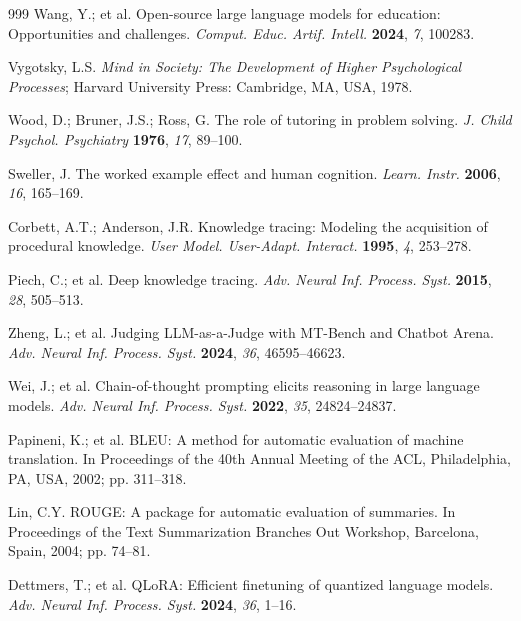 \documentclass[applsci,article,submit,pdftex,moreauthors]{Definitions/mdpi}
\begin{document}
\begin{thebibliography}{999}
Wang, Y.; et al. Open-source large language models for education: Opportunities and challenges. \textit{Comput. Educ. Artif. Intell.} \textbf{2024}, \textit{7}, 100283.

Vygotsky, L.S. \textit{Mind in Society: The Development of Higher Psychological Processes}; Harvard University Press: Cambridge, MA, USA, 1978.

Wood, D.; Bruner, J.S.; Ross, G. The role of tutoring in problem solving. \textit{J. Child Psychol. Psychiatry} \textbf{1976}, \textit{17}, 89--100.

Sweller, J. The worked example effect and human cognition. \textit{Learn. Instr.} \textbf{2006}, \textit{16}, 165--169.

Corbett, A.T.; Anderson, J.R. Knowledge tracing: Modeling the acquisition of procedural knowledge. \textit{User Model. User-Adapt. Interact.} \textbf{1995}, \textit{4}, 253--278.

Piech, C.; et al. Deep knowledge tracing. \textit{Adv. Neural Inf. Process. Syst.} \textbf{2015}, \textit{28}, 505--513.

Zheng, L.; et al. Judging LLM-as-a-Judge with MT-Bench and Chatbot Arena. \textit{Adv. Neural Inf. Process. Syst.} \textbf{2024}, \textit{36}, 46595--46623.

Wei, J.; et al. Chain-of-thought prompting elicits reasoning in large language models. \textit{Adv. Neural Inf. Process. Syst.} \textbf{2022}, \textit{35}, 24824--24837.

Papineni, K.; et al. BLEU: A method for automatic evaluation of machine translation. In Proceedings of the 40th Annual Meeting of the ACL, Philadelphia, PA, USA, 2002; pp. 311--318.

Lin, C.Y. ROUGE: A package for automatic evaluation of summaries. In Proceedings of the Text Summarization Branches Out Workshop, Barcelona, Spain, 2004; pp. 74--81.

Dettmers, T.; et al. QLoRA: Efficient finetuning of quantized language models. \textit{Adv. Neural Inf. Process. Syst.} \textbf{2024}, \textit{36}, 1--16.

\end{thebibliography}
\end{document}
